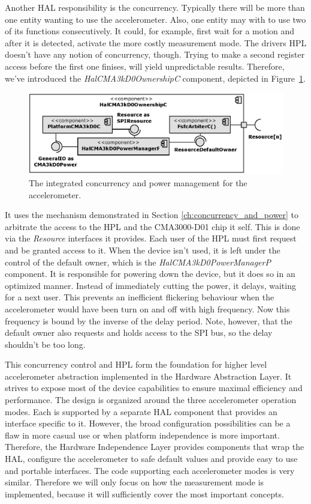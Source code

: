Another HAL responsibility is the concurrency. Typically there will be more than one entity wanting to use the accelerometer. Also, one entity may with to use two of its functions consecutively. It could, for example, first wait for a motion and after it is detected, activate the more costly measurement mode. The drivers HPL doesn't have any notion of concurrency, though. Trying to make a second register access before the first one finises, will yield unpredictable results. Therefore, we've introduced the \emph{HalCMA3kD0OwnershipC} component, depicted in Figure~\ref{fig:hal_cma3kd0_ownership_c}.
\begin{figure}[h]
  \centering
  \includegraphics{diagrams/hal_cma3kd0_ownership_c.eps}
  \caption{The integrated concurrency and power management for the accelerometer.}
  \label{fig:hal_cma3kd0_ownership_c}
\end{figure}
It uses the mechanism demonstrated in Section \ref{ch:concurrency_and_power} to arbitrate the access to the HPL and the CMA3000-D01 chip it self. This is done via the \emph{Resource} interfaces it provides. Each user of the HPL must first request and be granted access to it. When the device isn't used, it is left under the control of the default owner, which is the \emph{HalCMA3kD0PowerManagerP} component. It is responsible for powering down the device, but it does so in an optimized manner. Instead of immediately cutting the power, it delays, waiting for a next user. This prevents an inefficient flickering behaviour when the accelerometer would have been turn on and off with high frequency. Now this frequency is bound by the inverse of the delay period. Note, however, that the default owner also requests and holds access to the SPI bus, so the delay shouldn't be too long.

This concurrency control and HPL form the foundation for higher level accelerometer abstraction implemented in the Hardware Abstraction Layer. It strives to expose most of the device capabilities to ensure maximal efficiency and performance. The design is organized around the three accelerometer operation modes. Each is supported by a separate HAL component that provides an interface specific to it. However, the broad configuration possibilities can be a flaw in more casual use or when platform independence is more important. Therefore, the Hardware Independence Layer provides components that wrap the HAL, configure the accelerometer to safe default values and provide easy to use and portable interfaces. The code supporting each accelerometer modes is very similar. Therefore we will only focus on how the measurement mode is implemented, because it will sufficiently cover the most important concepts.

